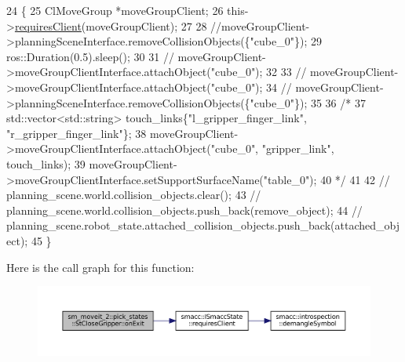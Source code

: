 \begin{DoxyCode}
24    \{
25       ClMoveGroup *moveGroupClient;
26       this->\hyperlink{classsmacc_1_1ISmaccState_a7f95c9f0a6ea2d6f18d1aec0519de4ac}{requiresClient}(moveGroupClient);
27 
28       \textcolor{comment}{//moveGroupClient->planningSceneInterface.removeCollisionObjects(\{"cube\_0"\});}
29       ros::Duration(0.5).sleep();
30 
31       \textcolor{comment}{// moveGroupClient->moveGroupClientInterface.attachObject("cube\_0");}
32 
33       \textcolor{comment}{// moveGroupClient->moveGroupClientInterface.attachObject("cube\_0");}
34       \textcolor{comment}{// moveGroupClient->planningSceneInterface.removeCollisionObjects(\{"cube\_0"\});}
35 
36       \textcolor{comment}{/*}
37 \textcolor{comment}{         std::vector<std::string> touch\_links\{"l\_gripper\_finger\_link", "r\_gripper\_finger\_link"\};}
38 \textcolor{comment}{         moveGroupClient->moveGroupClientInterface.attachObject("cube\_0", "gripper\_link", touch\_links);}
39 \textcolor{comment}{         moveGroupClient->moveGroupClientInterface.setSupportSurfaceName("table\_0");}
40 \textcolor{comment}{         */}
41 
42       \textcolor{comment}{// planning\_scene.world.collision\_objects.clear();}
43       \textcolor{comment}{// planning\_scene.world.collision\_objects.push\_back(remove\_object);}
44       \textcolor{comment}{// planning\_scene.robot\_state.attached\_collision\_objects.push\_back(attached\_object);}
45    \}
\end{DoxyCode}
Here is the call graph for this function\+:
\nopagebreak
\begin{figure}[H]
\begin{center}
\leavevmode
\includegraphics[width=350pt]{structsm__moveit__2_1_1pick__states_1_1StCloseGripper_a8beccb0dbff11d4f8109d943144f7632_cgraph}
\end{center}
\end{figure}
\mbox{\label{structsm__moveit__2_1_1pick__states_1_1StCloseGripper_a9213b0f6c212d272f6bcd61319f17c0e}} 
